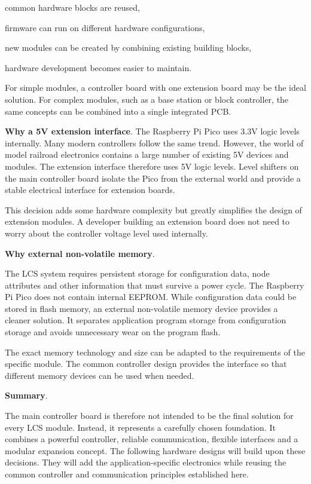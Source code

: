 \begin{smallGapItemize}
\item common hardware blocks are reused,
\item firmware can run on different hardware configurations,
\item new modules can be created by combining existing building blocks,
\item hardware development becomes easier to maintain.
\end{smallGapItemize}

For simple modules, a controller board with one extension board may be the
ideal solution. For complex modules, such as a base station or block
controller, the same concepts can be combined into a single integrated PCB.

\textbf{Why a 5V extension interface}.
The Raspberry Pi Pico uses 3.3V logic levels internally. Many modern
controllers follow the same trend. However, the world of model railroad
electronics contains a large number of existing 5V devices and modules.
The extension interface therefore uses 5V logic levels. Level shifters on the
main controller board isolate the Pico from the external world and provide a
stable electrical interface for extension boards.

This decision adds some hardware complexity but greatly simplifies the design
of extension modules. A developer building an extension board does not need
to worry about the controller voltage level used internally.

\textbf{Why external non-volatile memory}.

The LCS system requires persistent storage for configuration data, node
attributes and other information that must survive a power cycle.
The Raspberry Pi Pico does not contain internal EEPROM. While configuration
data could be stored in flash memory, an external non-volatile memory device
provides a cleaner solution. It separates application program storage from
configuration storage and avoids unnecessary wear on the program flash.

The exact memory technology and size can be adapted to the requirements of
the specific module. The common controller design provides the interface so
that different memory devices can be used when needed.

\textbf{Summary}.

The main controller board is therefore not intended to be the final solution
for every LCS module. Instead, it represents a carefully chosen foundation.
It combines a powerful controller, reliable communication, flexible
interfaces and a modular expansion concept. 
The following hardware designs will build upon these decisions. They will add
the application-specific electronics while reusing the common controller and
communication principles established here.

